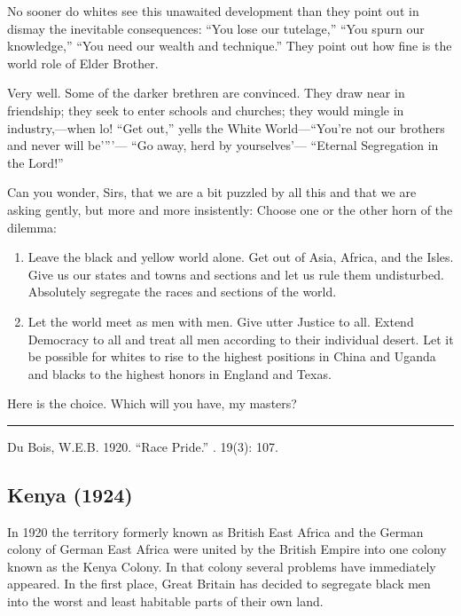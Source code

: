 \documentclass[letterpaper,10pt,english]{jupyterBook}
\begin{document}
\sphinxAtStartPar
No sooner do whites see this unawaited development than they point out in dismay the inevitable consequences: “You lose our tutelage,” “You spurn our knowledge,” “You need our wealth and technique.” They point out how fine is the world role of Elder Brother.

\sphinxAtStartPar
Very well. Some of the darker brethren are convinced. They draw near in friendship; they seek to enter schools and churches; they would mingle in industry,—when lo! “Get out,” yells the White World—“You’re not our brothers and never will be’”’— “Go away, herd by yourselves’— “Eternal Segregation in the Lord!”

\sphinxAtStartPar
Can you wonder, Sirs, that we are a bit puzzled by all this and that we are asking gently, but more and more insistently: Choose one or the other horn of the dilemma:
\begin{enumerate}
%
\item {} 
\sphinxAtStartPar
Leave the black and yellow world alone. Get out of Asia, Africa, and the Isles. Give us our states and towns and sections and let us rule them undisturbed. Absolutely segregate the races and sections of the world.

\item {} 
\sphinxAtStartPar
Let the world meet as men with men. Give utter Justice to all. Extend Democracy to all and treat all men according to their individual desert. Let it be possible for whites to rise to the highest positions in China and Uganda and blacks to the highest honors in England and Texas.

\end{enumerate}

\sphinxAtStartPar
Here is the choice. Which will you have, my masters?


\bigskip\hrule\bigskip


\sphinxAtStartPar
{} Du Bois, W.E.B. 1920. “Race Pride.” . 19(3): 107.


\subsection{Kenya (1924)}
\label{\detokenize{Volumes/27/04/kenya:kenya-1924}}\label{\detokenize{Volumes/27/04/kenya::doc}}
\sphinxAtStartPar
In 1920 the territory formerly known as British East Africa and the German colony of German East Africa were united by the British Empire into one colony known as the Kenya Colony. In that colony several problems have immediately appeared. In the first place, Great Britain has decided to segregate black men into the worst and least habitable parts of their own land.
\end{document}
